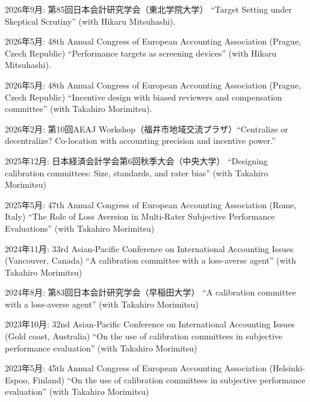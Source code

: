 \documentclass[letterpaper,11pt]{article}
\renewenvironment{itemize}{
  \begin{list}{}{
    \setlength{\leftmargin}{1.5em}
  }
}{
  \end{list}
}
\begin{document}
\begin{itemize}
    \item 2026年9月: 第85回日本会計研究学会（東北学院大学） ``Target Setting under Skeptical Scrutiny'' (with Hikaru Mitsuhashi).

    \item 2026年5月: 48th Annual Congress of European Accounting Association (Prague, Czech Republic) ``Performance targets as screening devices'' (with Hikaru Mitsuhashi).

    \item 2026年5月: 48th Annual Congress of European Accounting Association (Prague, Czech Republic) ``Incentive design with biased reviewers and compensation committee'' (with Takahiro Morimitsu).

    \item 2026年2月: 第10回AEAJ Workshop（福井市地域交流プラザ）``Centralize or decentralize? Co-location with accounting precision and incentive power.''

    \item 2025年12月: 日本経済会計学会第6回秋季大会（中央大学） ``Designing calibration committees: Size, standards, and rater bias'' (with Takahiro Morimitsu)

    \item 2025年5月: 47th Annual Congress of European Accounting Association (Rome, Italy) ``The Role of Loss Aversion in Multi-Rater Subjective Performance Evaluations'' (with Takahiro Morimitsu)

    \item 2024年11月: 33rd Asian-Pacific Conference on International Accounting Issues (Vancouver, Canada) ``A calibration committee with a loss-averse agent'' (with Takahiro Morimitsu)

    \item 2024年8月:  第83回日本会計研究学会（早稲田大学） ``A calibration committee with a loss-averse agent'' (with Takahiro Morimitsu)

    \item 2023年10月: 32nd Asian-Pacific Conference on International Accounting Issues (Gold coast, Australia) ``On the use of calibration committees in subjective performance evaluation'' (with Takahiro Morimitsu)

    \item 2023年5月: 45th Annual Congress of European Accounting Association (Helsinki-Espoo, Finland) ``On the use of calibration committees in subjective performance evaluation'' (with Takahiro Morimitsu)


\end{itemize}
\end{document}
